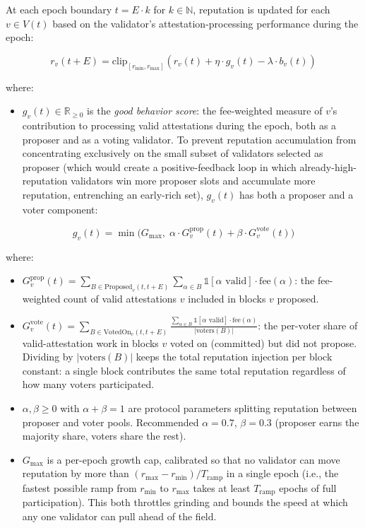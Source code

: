 \documentclass[
  11pt,
]{article}
\providecommand{\tightlist}{%
  \setlength{\itemsep}{0pt}\setlength{\parskip}{0pt}}
\begin{document}
At each epoch boundary \(t = E \cdot k\) for \(k \in \mathbb{N}\),
reputation is updated for each \(v \in V(t)\) based on the validator's
attestation-processing performance during the epoch:

\[r_v(t + E) = \text{clip}_{[r_{\min}, r_{\max}]}\left(r_v(t) + \eta \cdot g_v(t) - \lambda \cdot b_v(t)\right)\]

where:

\begin{itemize}
\tightlist
\item
  \(g_v(t) \in \mathbb{R}_{\geq 0}\) is the \emph{good behavior score}:
  the fee-weighted measure of \(v\)'s contribution to processing valid
  attestations during the epoch, both as a proposer and as a voting
  validator. To prevent reputation accumulation from concentrating
  exclusively on the small subset of validators selected as proposer
  (which would create a positive-feedback loop in which
  already-high-reputation validators win more proposer slots and
  accumulate more reputation, entrenching an early-rich set), \(g_v(t)\)
  has both a proposer and a voter component:
\end{itemize}

\[g_v(t) = \min\bigl(G_{\max},\; \alpha \cdot G_v^{\text{prop}}(t) + \beta \cdot G_v^{\text{vote}}(t)\bigr)\]

where:

\begin{itemize}
\item
  \(G_v^{\text{prop}}(t) = \sum_{B \in \text{Proposed}_v(t, t+E)} \sum_{\alpha \in B} \mathbb{1}[\alpha \text{ valid}] \cdot \text{fee}(\alpha)\):
  the fee-weighted count of valid attestations \(v\) included in blocks
  \(v\) proposed.
\item
  \(G_v^{\text{vote}}(t) = \sum_{B \in \text{VotedOn}_v(t, t+E)} \frac{\sum_{\alpha \in B} \mathbb{1}[\alpha \text{ valid}] \cdot \text{fee}(\alpha)}{|\text{voters}(B)|}\):
  the per-voter share of valid-attestation work in blocks \(v\) voted on
  (committed) but did not propose. Dividing by \(|\text{voters}(B)|\)
  keeps the total reputation injection per block constant: a single
  block contributes the same total reputation regardless of how many
  voters participated.
\item
  \(\alpha, \beta \geq 0\) with \(\alpha + \beta = 1\) are protocol
  parameters splitting reputation between proposer and voter pools.
  Recommended \(\alpha = 0.7\), \(\beta = 0.3\) (proposer earns the
  majority share, voters share the rest).
\item
  \(G_{\max}\) is a per-epoch growth cap, calibrated so that no
  validator can move reputation by more than
  \((r_{\max} - r_{\min}) / T_{\text{ramp}}\) in a single epoch (i.e.,
  the fastest possible ramp from \(r_{\min}\) to \(r_{\max}\) takes at
  least \(T_{\text{ramp}}\) epochs of full participation). This both
  throttles grinding and bounds the speed at which any one validator can
  pull ahead of the field.
\end{itemize}
\end{document}
